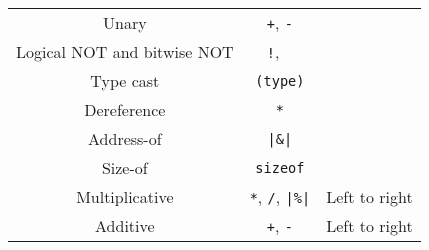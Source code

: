 \documentclass{article}
\begin{document}
\begin{table}[H]
\begin{tabular}{c c c}
        Unary                         & \texttt{+}, \texttt{-}                                                                                                                                                                                      &                                \\
        Logical NOT and bitwise NOT   & \texttt{!}, \texttt{~}                                                                                                                                                                                      &                                \\
        Type cast                     & \texttt{(type)}                                                                                                                                                                                                    &                                \\
        Dereference                   & \texttt{*}                                                                                                                                                                                                         &                                \\
        Address-of                    & \texttt{|\&|}                                                                                                                                                                                     &                                \\
        Size-of                       & \texttt{sizeof}                                                                                                                                                                                                    &                                \\
        \midrule
        Multiplicative                & \texttt{*}, \texttt{/}, \texttt{|\%|}                                                                                                                                               & Left to right                  \\
        Additive                      & \texttt{+}, \texttt{-}                                                                                                                                                                                      & Left to right                  \\

\end{tabular}
\end{table}
\end{document}

